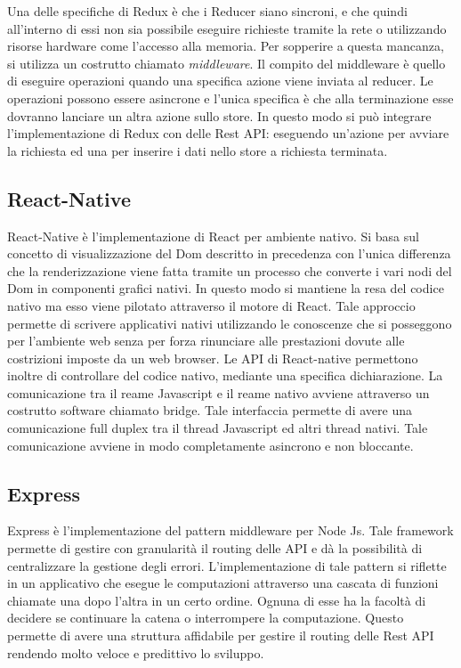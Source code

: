 	Una delle specifiche di Redux è che i Reducer siano sincroni, e che quindi all'interno di essi non sia possibile eseguire richieste tramite la rete o utilizzando risorse hardware come l'accesso alla memoria. Per sopperire a questa mancanza, si utilizza un costrutto chiamato \emph{middleware}. Il compito del middleware è quello di eseguire operazioni quando una specifica azione viene inviata al reducer. Le operazioni possono essere asincrone e l'unica specifica è che alla terminazione esse dovranno lanciare un altra azione sullo store. In questo modo si può integrare l'implementazione di Redux con delle Rest API: eseguendo un'azione per avviare la richiesta ed una per inserire i dati nello store a richiesta terminata.\vspace{5mm}
	
\subsection{React-Native}\vspace{5mm}

	React-Native è l'implementazione di React per ambiente nativo. Si basa sul concetto di visualizzazione del Dom descritto in precedenza con l'unica differenza che la renderizzazione viene fatta tramite un processo che converte i vari nodi del Dom in componenti grafici nativi. In questo modo si mantiene la resa del codice nativo ma esso viene pilotato attraverso il motore di React. Tale approccio permette di scrivere applicativi nativi utilizzando le conoscenze che si posseggono per l'ambiente web senza per forza rinunciare alle prestazioni dovute alle costrizioni imposte da un web browser. Le API di React-native permettono inoltre di controllare del codice nativo, mediante una specifica dichiarazione. La comunicazione tra il reame Javascript e il reame nativo avviene attraverso un costrutto software chiamato bridge. Tale interfaccia permette di avere una comunicazione full duplex tra il thread Javascript ed altri thread nativi. Tale comunicazione avviene in modo completamente asincrono e non bloccante.\vspace{5mm}

\subsection{Express}\vspace{5mm}

	Express è l'implementazione del pattern middleware per Node Js. Tale framework permette di gestire con granularità il routing delle API e dà la possibilità di centralizzare la gestione degli errori. L'implementazione di tale pattern si riflette in un applicativo che esegue le computazioni attraverso una cascata di funzioni chiamate una dopo l'altra in un certo ordine. Ognuna di esse ha la facoltà di decidere se continuare la catena o interrompere la computazione. Questo permette di avere una struttura affidabile per gestire il routing delle Rest API rendendo molto veloce e predittivo lo sviluppo.\vspace{5mm}

